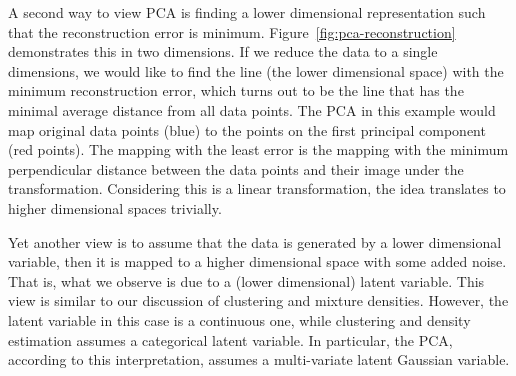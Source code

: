 A second way to view PCA is finding a lower dimensional representation
such that the reconstruction error is minimum.
Figure~\ref{fig:pca-reconstruction} demonstrates this in two dimensions.
If we reduce the data to a single dimensions,
we would like to find the line (the lower dimensional space)
with the minimum reconstruction error,
which turns out to be the line that has the minimal average distance
from all data points.
The PCA in this example would map original data points (blue)
to the points on the first principal component (red points).
The mapping with the least error is the mapping with the minimum
perpendicular distance between the data points
and their image under the transformation.
Considering this is a linear transformation,
the idea translates to higher dimensional spaces trivially.
\begin{marginfigure}
  \caption{\label{fig:pca-reconstruction}%
    Interpretation of the PCA as finding a lower
    dimensional representation with minimum reconstruction error.
  }
\end{marginfigure}

Yet another view is to assume that the data is generated
by a lower dimensional variable,
then it is mapped to a higher dimensional space with some added noise.
That is, what we observe is due to a (lower dimensional) latent variable.
This view is similar to our discussion of clustering and mixture densities.
However, the latent variable in this case is a continuous one,
while clustering and density estimation assumes
a categorical latent variable.
In particular,
the PCA, according to this interpretation,
assumes a multi-variate latent Gaussian variable.

